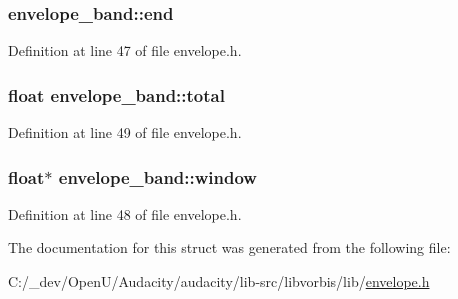 \subsubsection[{\texorpdfstring{end}{end}}]{ envelope\+\_\+band\+::end}\hypertarget{structenvelope__band_abf849c2990c227fc1d1667685c370bc2}{}\label{structenvelope__band_abf849c2990c227fc1d1667685c370bc2}


Definition at line 47 of file envelope.\+h.

\subsubsection[{\texorpdfstring{total}{total}}]{\setlength{\rightskip}{0pt plus 5cm}float envelope\+\_\+band\+::total}\hypertarget{structenvelope__band_a3f562ee35b24e837e858ddef98cbf5f7}{}\label{structenvelope__band_a3f562ee35b24e837e858ddef98cbf5f7}


Definition at line 49 of file envelope.\+h.

\subsubsection[{\texorpdfstring{window}{window}}]{\setlength{\rightskip}{0pt plus 5cm}float$\ast$ envelope\+\_\+band\+::window}\hypertarget{structenvelope__band_ae5ee62ee2b75d2ecfac29d8a5f554287}{}\label{structenvelope__band_ae5ee62ee2b75d2ecfac29d8a5f554287}


Definition at line 48 of file envelope.\+h.



The documentation for this struct was generated from the following file\+:\begin{DoxyCompactItemize}
\item 
C\+:/\+\_\+dev/\+Open\+U/\+Audacity/audacity/lib-\/src/libvorbis/lib/\hyperlink{lib-src_2libvorbis_2lib_2_envelope_8h}{envelope.\+h}\end{DoxyCompactItemize}
